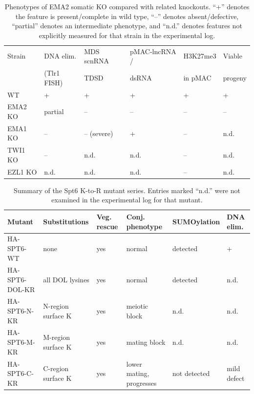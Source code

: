 \documentclass[11pt]{article}
\begin{document}
\begin{table}[htbp]
\centering
\caption{Phenotypes of EMA2 somatic KO compared with related knockouts.
``+'' denotes the feature is present/complete in wild type, ``--'' denotes
absent/defective, ``partial'' denotes an intermediate phenotype, and
``n.d.'' denotes features not explicitly measured for that strain in the
experimental log.}
\label{tab:phenotypes}
\begin{tabular}{llllll}
\toprule
Strain    & DNA elim.     & MDS scnRNA  & pMAC-lncRNA / & H3K27me3  & Viable           \\
          & (Tlr1 FISH)   & TDSD        & dsRNA         & in pMAC   & progeny          \\
\midrule
WT        & +             & +           & +             & +         & +                \\
EMA2 KO   & partial       & --          & --            & --        & --               \\
EMA1 KO   & --            & -- (severe) & +             & --        & n.d.             \\
TWI1 KO   & --            & n.d.        & n.d.          & --        & n.d.             \\
EZL1 KO   & n.d.          & n.d.        & n.d.          & --        & n.d.             \\
\bottomrule
\end{tabular}
\end{table}

\begin{table}[htbp]
\centering
\caption{Summary of the Spt6 K-to-R mutant series. Entries marked ``n.d.''
were not examined in the experimental log for that mutant.}
\label{tab:spt6mutants}
\begin{tabular}{llllll}
\toprule
Mutant      & Substitutions        & Veg. rescue & Conj. phenotype       & SUMOylation & DNA elim.   \\
\midrule
HA-SPT6-WT     & none                 & yes         & normal                & detected    & +           \\
HA-SPT6-DOL-KR & all DOL lysines      & yes         & normal                & detected    & n.d.        \\
HA-SPT6-N-KR   & N-region surface K   & yes         & meiotic block         & n.d.        & n.d.        \\
HA-SPT6-M-KR   & M-region surface K   & yes         & mating block          & n.d.        & n.d.        \\
HA-SPT6-C-KR   & C-region surface K   & yes         & lower mating, progresses & not detected & mild defect \\
\bottomrule
\end{tabular}
\end{table}
\end{document}
